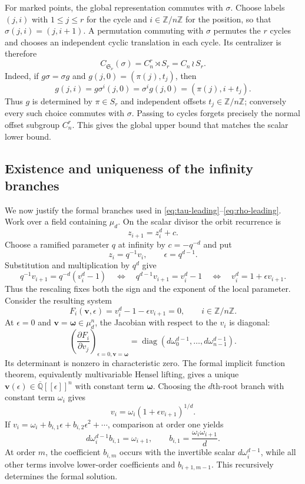 \documentclass[11pt]{article}
\theoremstyle{definition}
\theoremstyle{remark}
\newcommand{\Qbar}{\overline{\mathbb{Q}}}
\newcommand{\bw}{\boldsymbol{\omega}}
\newcommand{\wrp}{\mathbin{\wr}}
\begin{document}
For marked points, the global representation commutes with $\sigma$.  Choose
labels $(j,i)$ with $1\leq j\leq r$ for the cycle and
$i\in\mathbb Z/n\mathbb Z$ for the position, so that
$\sigma(j,i)=(j,i+1)$.  A permutation commuting with $\sigma$ permutes
the $r$ cycles and chooses an independent cyclic translation in each
cycle.  Its centralizer is therefore
\[
 C_{\mathfrak S_{\nu}}(\sigma)=C_n^r\rtimes S_r=C_n\wrp S_r.
\]
Indeed, if $g\sigma=\sigma g$ and $g(j,0)=(\pi(j),t_j)$, then
\[
 g(j,i)=g\sigma^i(j,0)=\sigma^ig(j,0)
       =(\pi(j),i+t_j).
\]
Thus $g$ is determined by $\pi\in S_r$ and independent offsets
$t_j\in\mathbb Z/n\mathbb Z$; conversely every such choice commutes with
$\sigma$.  Passing to cycles forgets precisely the normal offset subgroup
$C_n^r$.
This gives the global upper bound that matches the scalar lower bound.

\subsection{Existence and uniqueness of the infinity branches}

We now justify the formal branches used in
\eqref{eq:tau-leading}--\eqref{eq:rho-leading}.  Work over a field containing
$\mu_d$.  On the scalar divisor the orbit recurrence is
\[
 z_{i+1}=z_i^d+c.
\]
Choose a ramified parameter $q$ at infinity by $c=-q^{-d}$ and put
\[
 z_i=q^{-1}v_i,
 \qquad \epsilon=q^{d-1}.
\]
Substitution and multiplication by $q^d$ give
\[
 q^{-1}v_{i+1}=q^{-d}(v_i^d-1)
 \quad\Longleftrightarrow\quad
 q^{d-1}v_{i+1}=v_i^d-1
 \quad\Longleftrightarrow\quad
 v_i^d=1+\epsilon v_{i+1}.
\]
Thus the rescaling fixes both the sign and the exponent of the local
parameter.  Consider the resulting system
\[
 F_i(\mathbf v,\epsilon)
 =v_i^d-1-\epsilon v_{i+1}=0,
 \qquad i\in\mathbb Z/n\mathbb Z.
\]
At $\epsilon=0$ and $\mathbf v=\bw\in\mu_d^n$, the Jacobian with respect to
the $v_i$ is diagonal:
\[
 \left(\frac{\partial F_i}{\partial v_j}\right)_{\epsilon=0,\mathbf v=\bw}
 =\operatorname{diag}
 (d\omega_0^{d-1},\ldots,d\omega_{n-1}^{d-1}).
\]
Its determinant is nonzero in characteristic zero.  The formal implicit
function theorem, equivalently multivariable Hensel lifting, gives a unique
$\mathbf v(\epsilon)\in\Qbar[[\epsilon]]^n$ with constant term $\bw$.
Choosing the $d$th-root branch with constant term $\omega_i$ gives
\[
 v_i=\omega_i(1+\epsilon v_{i+1})^{1/d}.
\]
If $v_i=\omega_i+b_{i,1}\epsilon+b_{i,2}\epsilon^2+\cdots$, comparison at
order one yields
\[
 d\omega_i^{d-1}b_{i,1}=\omega_{i+1},
 \qquad
 b_{i,1}=\frac{\omega_i\omega_{i+1}}{d}.
\]
At order $m$, the coefficient $b_{i,m}$ occurs with the invertible scalar
$d\omega_i^{d-1}$, while all other terms involve lower-order coefficients
and $b_{i+1,m-1}$.  This recursively determines the formal solution.
\end{document}

